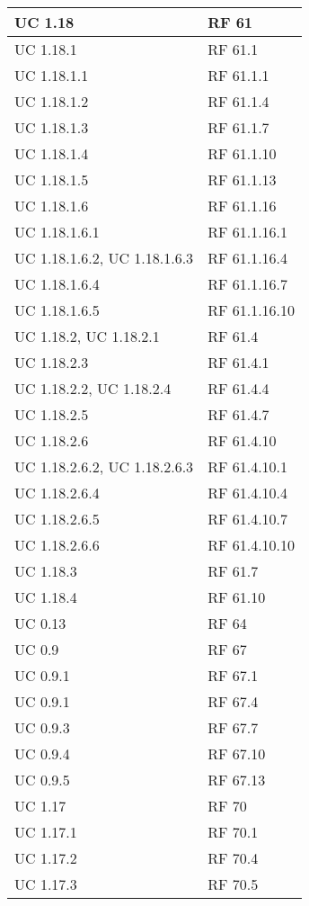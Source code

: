 {\begin{longtable} [c]{| p{4cm} | p{4cm} |}
 \hline 
UC 1.18 & RF 61\\ 
 \hline 
UC 1.18.1 & RF 61.1\\ 
 \hline 
UC 1.18.1.1 & RF 61.1.1\\ 
 \hline 
UC 1.18.1.2 & RF 61.1.4\\ 
 \hline 
UC 1.18.1.3 & RF 61.1.7\\ 
 \hline 
UC 1.18.1.4 & RF 61.1.10\\ 
 \hline 
UC 1.18.1.5 & RF 61.1.13\\ 
 \hline 
UC 1.18.1.6 & RF 61.1.16\\ 
 \hline 
UC 1.18.1.6.1 & RF 61.1.16.1\\ 
 \hline 
UC 1.18.1.6.2, UC 1.18.1.6.3 & RF 61.1.16.4\\ 
 \hline 
UC 1.18.1.6.4 & RF 61.1.16.7\\ 
 \hline 
UC 1.18.1.6.5 & RF 61.1.16.10\\ 
 \hline 
UC 1.18.2, UC 1.18.2.1 & RF 61.4\\ 
 \hline 
UC 1.18.2.3 & RF 61.4.1\\ 
 \hline 
UC 1.18.2.2, UC 1.18.2.4 & RF 61.4.4\\ 
 \hline 
UC 1.18.2.5 & RF 61.4.7\\ 
 \hline 
UC 1.18.2.6 & RF 61.4.10\\ 
 \hline 
UC 1.18.2.6.2, UC 1.18.2.6.3 & RF 61.4.10.1\\ 
 \hline 
UC 1.18.2.6.4 & RF 61.4.10.4\\ 
 \hline 
UC 1.18.2.6.5 & RF 61.4.10.7\\ 
 \hline 
UC 1.18.2.6.6 & RF 61.4.10.10\\ 
 \hline 
UC 1.18.3 & RF 61.7\\ 
 \hline 
UC 1.18.4 & RF 61.10\\ 
 \hline 
UC 0.13 & RF 64\\ 
 \hline 
UC 0.9 & RF 67\\ 
 \hline 
UC 0.9.1 & RF 67.1\\ 
 \hline 
UC 0.9.1 & RF 67.4\\ 
 \hline 
UC 0.9.3 & RF 67.7\\ 
 \hline 
UC 0.9.4 & RF 67.10\\ 
 \hline 
UC 0.9.5 & RF 67.13\\ 
 \hline 
UC 1.17 & RF 70\\ 
 \hline 
UC 1.17.1 & RF 70.1\\ 
 \hline 
UC 1.17.2 & RF 70.4\\ 
 \hline 
UC 1.17.3 & RF 70.5\\ 

\end{longtable}}
